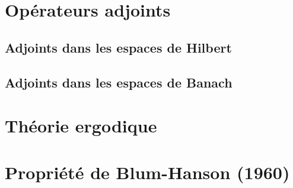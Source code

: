 \section{Opérateurs adjoints}
\subsection{Adjoints dans les espaces de Hilbert }

\subsection{Adjoints dans les espaces de Banach}

\section{Théorie ergodique}


\section{Propriété de Blum-Hanson (1960)}
